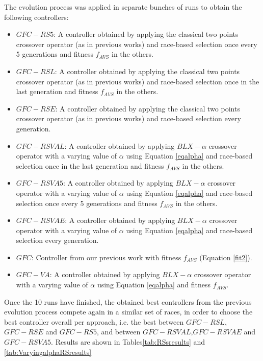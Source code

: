 \documentclass[10pt,journal,compsoc]{IEEEtran}
\begin{document}
The evolution process was applied in separate bunches of runs to obtain the following controllers:
\begin{itemize}
	\item $GFC-RS5$: A controller obtained by applying the classical two points crossover operator (as in previous works) and race-based selection once every 5 generations and fitness $f_{AVS}$ in the others. 
	\item $GFC-RSL$: A controller obtained by applying the classical two points crossover operator (as in previous works) and race-based selection once in the last generation and fitness $f_{AVS}$ in the others. 
	\item $GFC-RSE$: A controller obtained by applying the classical two points crossover operator (as in previous works) and race-based selection every generation. 
	 
	\item $GFC-RSVAL$: A controller obtained by applying $BLX-\alpha$ crossover operator with a varying value of $\alpha$ using Equation \ref{eqalpha} and race-based selection once in the last generation and fitness $f_{AVS}$ in the others. 
	 
	\item $GFC-RSVA5$: A controller obtained by applying $BLX-\alpha$ crossover operator with a varying value of $\alpha$ using Equation \ref{eqalpha} and race-based selection once every 5 generations and fitness $f_{AVS}$ in the others. 
	 
	\item $GFC-RSVAE$: A controller obtained by applying $BLX-\alpha$ crossover operator with a varying value of $\alpha$ using Equation \ref{eqalpha} and race-based selection every generation. 
	
		\item $GFC$: Controller  from our previous work \cite{salem_cig2018} with fitness  $f_{AVS}$ (Equation \ref{fit2}).
	\item $GFC-VA$: A controller obtained by applying $BLX-\alpha$ crossover operator with a varying value of $\alpha$ using Equation \ref{eqalpha} and fitness $f_{AVS}$. 	
\end{itemize}

Once the 10 runs have finished, the obtained best controllers from the previous evolution process  compete again in a similar set of races, in order to choose the best controller overall per approach, i.e. the best between $GFC-RSL$, $GFC-RSE$ and $GFC-RS5$, and between $GFC-RSVAL$,$GFC-RSVAE$ and $GFC-RSVA5$.
Results are shown in Tables\ref{tab:RSsresults} and \ref{tab:VaryingalphaRSresults}
\end{document}
